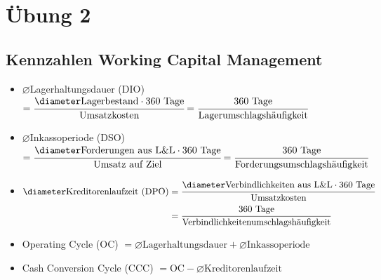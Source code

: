 \section{Übung 2}

\subsection{Kennzahlen Working Capital Management}
\begin{itemize}
	\item $\diameter$Lagerhaltungsdauer (DIO) $=\cfrac{\diameter\text{Lagerbestand}\cdot 360\text{ Tage}}{\text{Umsatzkosten}}=\cfrac{360\text{ Tage}}{\text{Lagerumschlagshäufigkeit}}$
	\item $\diameter$Inkassoperiode (DSO) $=\cfrac{\diameter\text{Forderungen aus L\&L}\cdot 360\text{ Tage}}{\text{Umsatz auf Ziel}}=\cfrac{360\text{ Tage}}{\text{Forderungsumschlagshäufigkeit}}$
	\item 
	$
		\begin{aligned}[t]
			\diameter\text{Kreditorenlaufzeit (DPO)} & = \cfrac{\diameter\text{Verbindlichkeiten aus L\&L}\cdot 360\text{ Tage}}{\text{Umsatzkosten}} \\
			& = \cfrac{360\text{ Tage}}{\text{Verbindlichkeitenumschlagshäufigkeit}}
		\end{aligned}$
	\item Operating Cycle (OC) $=\diameter\text{Lagerhaltungsdauer}+\diameter\text{Inkassoperiode}$
	\item Cash Conversion Cycle (CCC) $= \text{OC}-\diameter\text{Kreditorenlaufzeit}$
\end{itemize}

